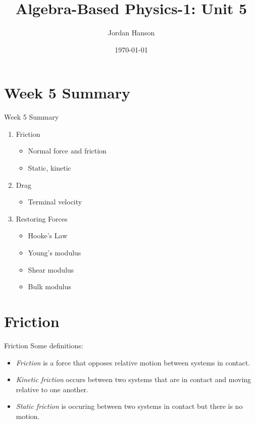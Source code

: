 \documentclass{beamer}
\title{Algebra-Based Physics-1: Unit 5}
\date{\today}
\author{Jordan Hanson}
\institute{Whittier College Department of Physics and Astronomy}
\begin{document}
\maketitle


\section{Week 5 Summary}

\begin{frame}{Week 5 Summary}
\begin{enumerate}
\item \alert{Friction}
\begin{itemize}
\item Normal force and friction
\item Static, kinetic
\end{itemize}
\item \alert{Drag}
\begin{itemize}
\item Terminal velocity
\end{itemize}
\item \alert{Restoring Forces}
\begin{itemize}
\item Hooke's Law
\item Young's modulus
\item Shear modulus
\item Bulk modulus
\end{itemize}
\end{enumerate}
\end{frame}

\section{Friction}

\begin{frame}{Friction}
Some definitions: \\
\begin{itemize}
\item \textit{\alert{Friction}} is a force that opposes relative motion between systems in contact.
\item \textit{\alert{Kinetic friction}} occurs between two systems that are in contact and moving relative to one another.
\item \textit{\alert{Static friction}} is occuring between two systems in contact but there is no motion.
\end{itemize}
\end{frame}
\end{document}
